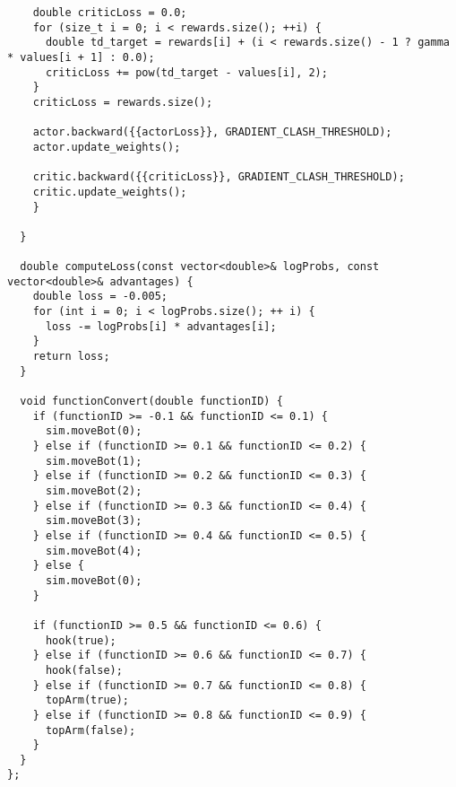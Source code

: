 \begin{verbatim}
    double criticLoss = 0.0;
    for (size_t i = 0; i < rewards.size(); ++i) {
      double td_target = rewards[i] + (i < rewards.size() - 1 ? gamma * values[i + 1] : 0.0);
      criticLoss += pow(td_target - values[i], 2);
    }
    criticLoss = rewards.size();
 
    actor.backward({{actorLoss}}, GRADIENT_CLASH_THRESHOLD);
    actor.update_weights();
 
    critic.backward({{criticLoss}}, GRADIENT_CLASH_THRESHOLD);
    critic.update_weights();
    }
 
  }
 
  double computeLoss(const vector<double>& logProbs, const vector<double>& advantages) {
    double loss = -0.005;
    for (int i = 0; i < logProbs.size(); ++ i) {
      loss -= logProbs[i] * advantages[i];
    }
    return loss;
  }
 
  void functionConvert(double functionID) {
    if (functionID >= -0.1 && functionID <= 0.1) {
      sim.moveBot(0);
    } else if (functionID >= 0.1 && functionID <= 0.2) {
      sim.moveBot(1);
    } else if (functionID >= 0.2 && functionID <= 0.3) {
      sim.moveBot(2);
    } else if (functionID >= 0.3 && functionID <= 0.4) {
      sim.moveBot(3);
    } else if (functionID >= 0.4 && functionID <= 0.5) {
      sim.moveBot(4);
    } else {
      sim.moveBot(0);
    }
 
    if (functionID >= 0.5 && functionID <= 0.6) {
      hook(true);
    } else if (functionID >= 0.6 && functionID <= 0.7) {
      hook(false);
    } else if (functionID >= 0.7 && functionID <= 0.8) {
      topArm(true);
    } else if (functionID >= 0.8 && functionID <= 0.9) {
      topArm(false);
    }
  }
};
\end{verbatim}
